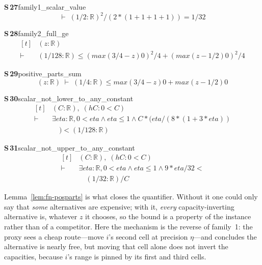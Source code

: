 \documentclass[conference]{IEEEtran}
\theoremstyle{definition}
\newcommand{\lean}[1]{\textsf{\footnotesize #1}}
\begin{document}
\noindent\textbf{S\,27}\quad\lean{family1\_scalar\_value}
{\footnotesize\[ \vdash\; (1/2 : \mathbb{R} ) ^{2} / (2 * (1 + 1 + 1 + 1)) = 1 / 32 \]}

\noindent\textbf{S\,28}\quad\lean{family2\_full\_ge}
{\footnotesize\[ \begin{aligned}[t]
&(\mathit{z} : \mathbb{R} )\\
\vdash\;&(1/128 : \mathbb{R} ) \leq (\mathit{max} (3/4 - \mathit{z}) 0) ^{2} / 4 + (\mathit{max} (\mathit{z} - 1/2) 0) ^{2} / 4
\end{aligned} \]}

\noindent\textbf{S\,29}\quad\lean{positive\_parts\_sum}
{\footnotesize\[ (\mathit{z} : \mathbb{R} ) \;\vdash\; (1/4 : \mathbb{R} ) \leq \mathit{max} (3/4 - \mathit{z}) 0 + \mathit{max} (\mathit{z} - 1/2) 0 \]}

\noindent\textbf{S\,30}\quad\lean{scalar\_not\_lower\_to\_any\_constant}
{\footnotesize\[ \begin{aligned}[t]
&(\mathit{C} : \mathbb{R} ),\; (\mathit{hC} : 0 < \mathit{C})\\
\vdash\;&\exists \mathit{eta} : \mathbb{R} , 0 < \mathit{eta} \wedge \mathit{eta} \leq 1 \wedge \mathit{C} * (\mathit{eta} / (8 * (1 + 3 * \mathit{eta}))\\
&\quad ) < (1 / 128 : \mathbb{R} )
\end{aligned} \]}

\noindent\textbf{S\,31}\quad\lean{scalar\_not\_upper\_to\_any\_constant}
{\footnotesize\[ \begin{aligned}[t]
&(\mathit{C} : \mathbb{R} ),\; (\mathit{hC} : 0 < \mathit{C})\\
\vdash\;&\exists \mathit{eta} : \mathbb{R} , 0 < \mathit{eta} \wedge \mathit{eta} \leq 1 \wedge 9 * \mathit{eta} / 32 <\\
&\quad (1 / 32 : \mathbb{R} ) / \mathit{C}
\end{aligned} \]}


Lemma~\ref{lem:fn-posparts} is what closes the quantifier. Without it one could only say that
\emph{some} alternatives are expensive; with it, \emph{every} capacity-inverting alternative
is, whatever $z$ it chooses, so the bound is a property of the instance rather than of a
competitor. Here the mechanism is the reverse of family~1: the proxy sees a cheap route---move
$i$'s second cell at precision $\eta$---and concludes the alternative is nearly free, but
moving that cell alone does not invert the capacities, because $i$'s range is pinned by its
first and third cells.
\end{document}
